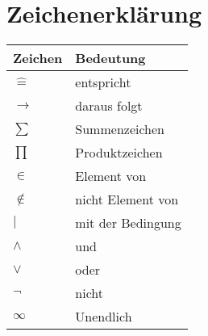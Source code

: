 \documentclass{formulaCollection}
\begin{document}
\section{Zeichenerklärung}

\begin{tabular}[h]{l|l}
Zeichen &Bedeutung  \\
\hline
$\widehat{=}$ & entspricht  \\
$\longrightarrow$ & daraus folgt \\
$\sum$ & Summenzeichen \\
$\prod$ & Produktzeichen \\
$\in$ & Element von \\
$\notin$ & nicht Element von \\
$|$ & mit der Bedingung \\
$\land$ & und \\
$\lor$ & oder \\
$\lnot$ & nicht \\
$\infty$ & Unendlich \\

\end{tabular}
\end{document}
